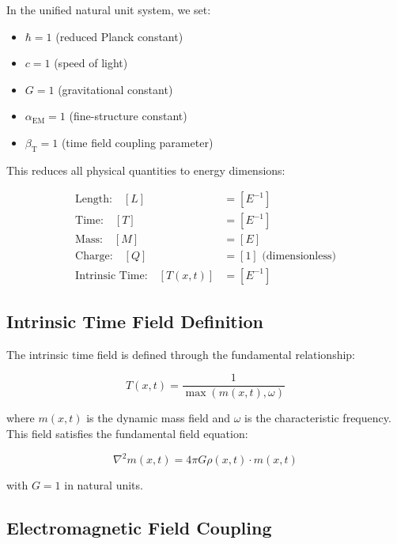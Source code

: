 \documentclass[12pt,a4paper]{article}
\newcommand{\Tfieldt}{T(x,t)}
\newcommand{\alphaEM}{\alpha_{\text{EM}}}
\newcommand{\betaT}{\beta_{\text{T}}}
\begin{document}
	In the unified natural unit system, we set:
	\begin{itemize}
		\item $\hbar = 1$ (reduced Planck constant)
		\item $c = 1$ (speed of light)
		\item $G = 1$ (gravitational constant)
		\item $\alphaEM = 1$ (fine-structure constant)
		\item $\betaT = 1$ (time field coupling parameter)
	\end{itemize}
	
	This reduces all physical quantities to energy dimensions:
	
	\begin{tcolorbox}[colback=blue!5!white,colframe=blue!75!black,title=Unified Natural Units Dimensional Structure]
		\begin{align}
			\text{Length:} \quad [L] &= [E^{-1}] \\
			\text{Time:} \quad [T] &= [E^{-1}] \\
			\text{Mass:} \quad [M] &= [E] \\
			\text{Charge:} \quad [Q] &= [1] \text{ (dimensionless)} \\
			\text{Intrinsic Time:} \quad [\Tfieldt] &= [E^{-1}]
		\end{align}
	\end{tcolorbox}
	
	\subsection{Intrinsic Time Field Definition}
	\label{subsec:time_field_definition}
	
	The intrinsic time field is defined through the fundamental relationship:
	
	\begin{equation}
		\Tfieldt = \frac{1}{\max(m(x,t), \omega)}
	\end{equation}
	
	where $m(x,t)$ is the dynamic mass field and $\omega$ is the characteristic frequency. This field satisfies the fundamental field equation:
	
	\begin{equation}
		\nabla^2 m(x,t) = 4\pi G \rho(x,t) \cdot m(x,t)
	\end{equation}
	
	with $G = 1$ in natural units.
	
	\subsection{Electromagnetic Field Coupling}
	\label{subsec:em_coupling}
	
\end{document}
